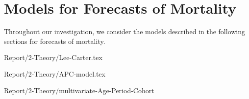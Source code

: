 \newpage
\section{Models for Forecasts of Mortality}
\label{sec:ModelsPopulationDevelopment}

Throughout our investigation, we consider the models described in the following sections for forecasts of mortality. 

{Report/2-Theory/Lee-Carter.tex}

{Report/2-Theory/APC-model.tex}

{Report/2-Theory/multivariate-Age-Period-Cohort}